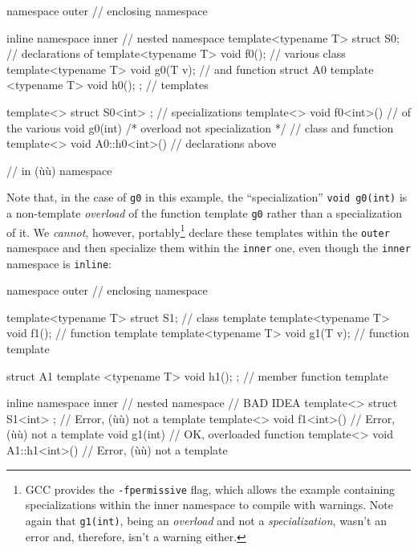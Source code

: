 \begin{emcppslisting}
namespace outer                                          // enclosing namespace
{
    inline namespace inner                               // nested namespace
    {
        template<typename T> struct S0;                  // declarations of
        template<typename T> void f0();                  // various class
        template<typename T> void g0(T v);               // and function
        struct A0 { template <typename T> void h0(); };  // templates
    }

    template<> struct S0<int> { };                       // specializations
    template<> void f0<int>() { }                        // of the various
    void g0(int) { }  /* overload not specialization */  // class and function
    template<> void A0::h0<int>() { }                    // declarations above
}                                                        // in (ù{}ù) namespace
\end{emcppslisting}

\noindent Note that, in the case of \lstinline!g0! in this example, the
``specialization'' \lstinline!void!~\lstinline!g0(int)! is a non-template
\emph{overload} of the function template \lstinline!g0! rather than a
specialization of it. We \emph{cannot}, however,
portably{\cprotect\footnote{GCC provides the \lstinline!-fpermissive! flag,
which allows the example containing specializations within the inner
namespace to compile with warnings. Note again that \lstinline!g1(int)!,
being an \emph{overload} and not a \emph{specialization}, wasn't an
  error and, therefore, isn't a warning either.}} declare these
templates within the \lstinline!outer! namespace and then specialize them
within the \lstinline!inner! one, even though the \lstinline!inner! namespace
is \lstinline!inline!:

\begin{emcppslisting}
namespace outer                                     // enclosing namespace
{
    template<typename T> struct S1;                 // class template
    template<typename T> void f1();                 // function template
    template<typename T> void g1(T v);              // function template

    struct A1 { template <typename T> void h1(); }; // member function template

    inline namespace inner                          // nested namespace
    {                                               // BAD IDEA
        template<> struct S1<int> { };              // Error, (ù{}ù) not a template
        template<> void f1<int>() { }               // Error, (ù{}ù) not a template
        void g1(int) { }                            // OK, overloaded function
        template<> void A1::h1<int>() { }           // Error, (ù{}ù) not a template
    }
}
\end{emcppslisting}

